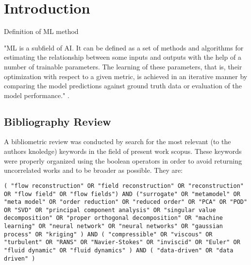 

\chapter{Introduction}
\label{cap_introduction}
Definition of ML method

"ML is a subfield of AI. It can be defined as a set of methods and algorithms for estimating the relationship between some inputs and outputs with the help of a number of trainable parameters. The learning of these parameters, that is, their optimization with respect to a given metric, is achieved in an iterative manner by comparing the model predictions against ground truth data or evaluation of the model performance." \cite{beckPerspective2021}.

\section{Bibliography Review}

A bibliometric review was conducted by search for the most relevant (to the authors knoledge) keywords in the field of present work scopus. These keywords were properly organized using the boolean operators in order to avoid returning uncorrelated works and to be broader as possible.
They are:


\begin{lstlisting}[breaklines,basicstyle=\ttfamily, columns=fullflexible, keepspaces=true, backgroundcolor = \color{pastelgray}, breakatwhitespace=false, numbers=none]
    ( "flow reconstruction" OR "field reconstruction" OR "reconstruction" OR "flow field" OR "flow fields") AND ("surrogate" OR "metamodel" OR "meta model" OR "order reduction" OR "reduced order" OR "PCA" OR "POD" OR "SVD" OR "principal component analysis" OR "singular value decomposition" OR "proper orthogonal decomposition" OR "machine learning" OR "neural network" OR "neural networks" OR "gaussian process" OR "kriging" ) AND ( "compressible" OR "viscous" OR "turbulent" OR "RANS" OR "Navier-Stokes" OR "inviscid" OR "Euler" OR "fluid dynamic" OR "fluid dynamics" ) AND ( "data-driven" OR "data driven" )    
\end{lstlisting}     


